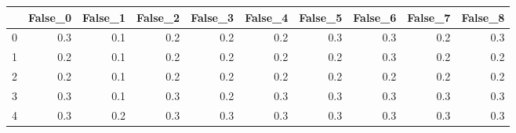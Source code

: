 \begin{tabular}{lrrrrrrrrr}
\toprule
{} &  False\_0 &  False\_1 &  False\_2 &  False\_3 &  False\_4 &  False\_5 &  False\_6 &  False\_7 &  False\_8 \\ \hline
\midrule
0 &      0.3 &      0.1 &      0.2 &      0.2 &      0.2 &      0.3 &      0.3 &      0.2 &      0.3 \\ \hline
1 &      0.2 &      0.1 &      0.2 &      0.2 &      0.2 &      0.2 &      0.3 &      0.2 &      0.2 \\ \hline
2 &      0.2 &      0.1 &      0.2 &      0.2 &      0.2 &      0.2 &      0.2 &      0.2 &      0.2 \\ \hline
3 &      0.3 &      0.1 &      0.3 &      0.2 &      0.3 &      0.3 &      0.3 &      0.3 &      0.3 \\ \hline
4 &      0.3 &      0.2 &      0.3 &      0.3 &      0.3 &      0.3 &      0.3 &      0.3 &      0.3 \\ \hline
\bottomrule
\end{tabular}

